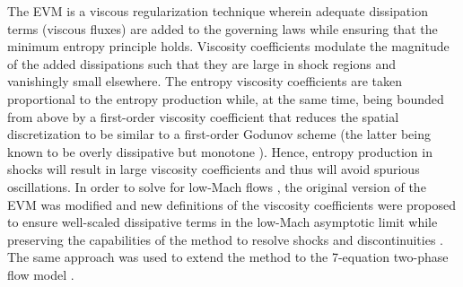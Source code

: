 \documentclass{inputs/mc2015}
\begin{document}
 The EVM is a viscous regularization technique wherein adequate dissipation terms (viscous fluxes) are added to the governing laws while ensuring 
that the minimum entropy principle holds. Viscosity coefficients modulate the magnitude of the added dissipations such that they are large in shock regions and vanishingly 
small elsewhere. The entropy viscosity coefficients are taken proportional to the entropy production while, at the same time, being bounded from above by a first-order 
viscosity coefficient that reduces the spatial discretization to be similar to a first-order Godunov scheme (the latter being known to be overly dissipative but monotone 
\cite{Toro}). Hence, entropy production in shocks will result in large viscosity coefficients and thus will avoid spurious oscillations. In order to solve for 
low-Mach flows \cite{LowMach1, LowMach2, LowMach3}, the original version of the EVM was modified and new definitions of the viscosity coefficients 
were proposed to ensure well-scaled dissipative terms in the low-Mach asymptotic limit while preserving the capabilities of the method to resolve shocks and discontinuities 
\cite{Marco_dissertation, Marco_paper_low_mach}. The same approach was used to extend the method to the 7-equation two-phase flow model 
\cite{Marco_paper_7_equ, Marco_dissertation}. 
\end{document}
